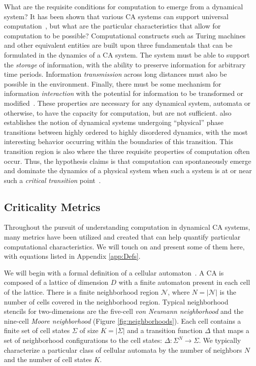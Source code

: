 \documentclass[a4paper,11pt]{article}
\begin{document}
What are the requisite conditions for computation to emerge from a dynamical system?
It has been shown that various CA systems can support universal computation~\cite{wf86}, but what are the particular characteristics that allow for computation to be possible? Computational constructs such as Turing machines and other equivalent entities are built upon three fundamentals that can be formulated in the dynamics of a CA system. The system must be able to support the \textit{storage} of information, with the ability to preserve information for arbitrary time periods. Information \textit{transmission} across long distances must also be possible in the environment. Finally, there must be some mechanism for information \textit{interaction} with the potential for information to be transformed or modified~\cite{la90}. These properties are necessary for any dynamical system, automata or otherwise, to have the capacity for computation, but are not sufficient. \citeauthor{la90} also establishes the notion of dynamical systems undergoing ``physical'' phase transitions between highly ordered to highly disordered dynamics, with the most interesting behavior occurring within the boundaries of this transition. This transition region is also where the three requisite properties of computation often occur. Thus, the hypothesis \citeauthor{la90} claims is that computation can spontaneously emerge and dominate the dynamics of a physical system when such a system is at or near such a \textit{critical transition} point~\cite{la90}. 

\subsection{Criticality Metrics}
\label{subsec:metrics}
Throughout the pursuit of understanding computation in dynamical CA systems, many metrics have been utilized and created that can help quantify particular computational characteristics. We will touch on and present some of them here, with equations listed in Appendix \ref{app:Defs}.

\medskip

We will begin with a formal definition of a cellular automaton~\cite{la90}. A CA is composed of a lattice of dimension $D$ with a finite automaton present in each cell of the lattice. There is a finite neighborhood region $\mathcal{N}$, where $N = |\mathcal{N}|$ is the number of cells covered in the neighborhood region. Typical neighborhood stencils for two-dimensions are the five-cell \textit{von Neumann neighborhood} and the nine-cell \textit{Moore neighborhood} (Figure \ref{fig:neighborhoods}). Each cell contains a finite set of cell states $\Sigma$ of size $K = |\Sigma|$ and a transition function $\Delta$ that maps a set of neighborhood configurations to the cell states: $\Delta: \Sigma^N \to \Sigma$. We typically characterize a particular class of cellular automata by the number of neighbors $N$ and the number of cell states $K$. 
\end{document}
